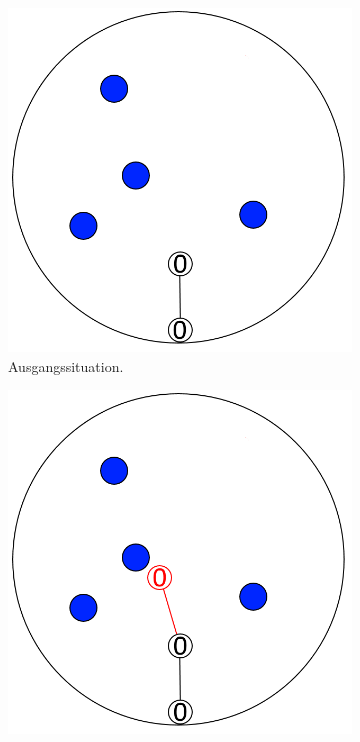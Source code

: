 \begin{figure} [hbtp]
	\centering
	\begin{subfigure}[t]{.31\textwidth}
		\centering
		\includegraphics[width=\linewidth]{images/SCA_Zweigtiefe1.png}
		\caption{Ausgangssituation.}
		\label{subfig:SCA_Zweigtiefe1}
	\end{subfigure}
	\hspace{.01\textwidth}
	\begin{subfigure}[t]{.31\textwidth}
		\centering
		\includegraphics[width=\linewidth]{images/SCA_Zweigtiefe2.png}

\end{subfigure}
\end{figure}
